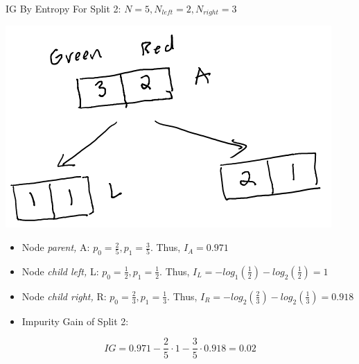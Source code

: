 \documentclass[
  ignorenonframetext,
]{beamer}
\begin{document}
\begin{frame}{IG By Entropy}
\protect\hypertarget{ig-by-entropy-1}{}
For Split 2: \(N = 5, N_{left} =2, N_{right} = 3\)

\includegraphics{images/im3.png}

\begin{itemize}
\item
  Node \emph{parent,} A: \(p_0 = \frac{2}{5}, p_1 = \frac{3}{5}\). Thus,
  \(I_{A} = 0.971\)
\item
  Node \emph{child left,} L: \(p_0 = \frac{1}{2}, p_1 = \frac{1}{2}\).
  Thus, \(I_{L} = - log_1(\frac{1}{2})-log_2(\frac{1}{2})=1\)
\item
  Node \emph{child right,} R: \(p_0 = \frac{2}{3}, p_1 = \frac{1}{3}\).
  Thus, \(I_{R} = -log_2(\frac{2}{3}) -log_2(\frac{1}{3}) = 0.918\)
\item
  Impurity Gain of Split 2:
\end{itemize}

\[IG = 0.971 - \frac{2}{5} \cdot 1-\frac{3}{5} \cdot 0.918 = 0.02\]
\end{frame}
\end{document}
